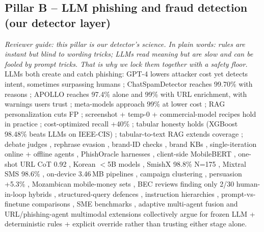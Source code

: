 \documentclass[11pt,a4paper]{article}
\begin{document}
\subsection{Pillar B -- LLM phishing and fraud detection (our detector layer)}
\noindent\textit{Reviewer guide: this pillar is our detector's science. In plain words: rules are instant but blind to wording tricks; LLMs read meaning but are slow and can be fooled by prompt tricks. That is why we lock them together with a safety floor.}
LLMs both create and catch phishing: GPT-4 lowers attacker cost yet detects intent, sometimes surpassing humans \cite{Heiding24,HeidingIntent24}; ChatSpamDetector reaches 99.70\% with reasons \cite{Koide24}; APOLLO reaches 97.4\% alone and 99\% with URL enrichment, with warnings users trust \cite{Desolda24}; meta-models approach 99\% at lower cost \cite{Nair25}; RAG personalization cuts FP \cite{UserRAG26}; screenshot + temp-0 + commercial-model recipes hold in practice \cite{Ji25}; cost-optimized recall +40\% \cite{CLASP25}; tabular honesty holds (XGBoost 98.48\% beats LLMs on IEEE-CIS) \cite{FinFraud25}; tabular-to-text RAG extends coverage \cite{FinFRE25}; debate judges \cite{PhishDebate25}, rephrase evasion \cite{NextGenPhish24}, brand-ID checks \cite{MMPhish24}, brand KBs \cite{KnowPhish24}, single-iteration online + offline agents \cite{PhishAgent25}, PhishOracle harnesses \cite{PhishOracle24}, client-side MobileBERT \cite{PhishLang24}, one-shot URL CoT 0.92 \cite{OneShotURL24}, Korean $<$5B models \cite{KorSmish24}, SmishX 98.8\% N=175 \cite{SmishX25}, Mixtral SMS 98.6\% \cite{SpaLLM25}, on-device 3.46\,MB pipelines \cite{COPS24}, campaign clustering \cite{SmishCheck25}, persuasion +5.3\% \cite{Persuade24}, Mozambican mobile-money sets \cite{MozSmish25}, BEC reviews finding only 2/30 human-in-loop hybrids \cite{BECReview25}, structured-query defences \cite{StruQ24}, instruction hierarchies \cite{Hierarchy24}, prompt-vs-finetune comparisons \cite{PromptVsTune24}, SME benchmarks \cite{ZhangSME25}, adaptive multi-agent fusion \cite{MultiGuard25} and URL/phishing-agent multimodal extensions \cite{Lee25,Kuikel25,PhishAgent25} collectively argue for frozen LLM + deterministic rules + explicit override rather than trusting either stage alone.
\end{document}
